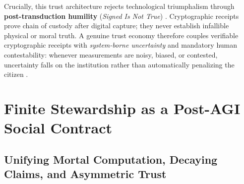 \documentclass[11pt]{article}
\begin{document}
Crucially, this trust architecture rejects technological triumphalism through \textbf{post-transduction humility} (\emph{Signed Is Not True}) \citep{fu2018sensors}. Cryptographic receipts prove chain of custody after digital capture; they never establish infallible physical or moral truth. A genuine trust economy therefore couples verifiable cryptographic receipts with \emph{system-borne uncertainty} and mandatory human contestability: whenever measurements are noisy, biased, or contested, uncertainty falls on the institution rather than automatically penalizing the citizen \citep{baker2026cin}.

\section{Finite Stewardship as a Post-AGI Social Contract}\label{sec:stewardship}

\subsection{Unifying Mortal Computation, Decaying Claims, and Asymmetric Trust}
\end{document}
